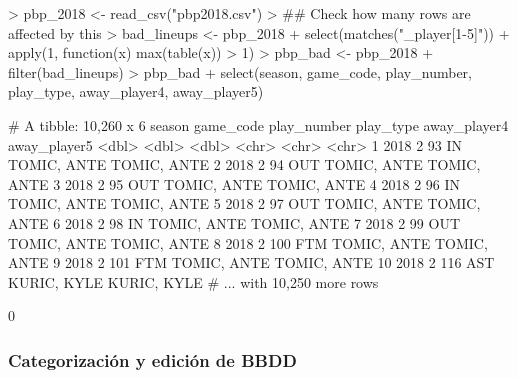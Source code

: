 \documentclass[paper=a4, fontsize=9pt]{article}
\begin{document}
\begin{Schunk}
\begin{Sinput}
> pbp_2018 <- read_csv("pbp2018.csv")
> ## Check how many rows are affected by this
> bad_lineups <- pbp_2018 %
+   select(matches("_player[1-5]")) %
+   apply(1, function(x) max(table(x)) > 1)
> pbp_bad <- pbp_2018 %
+   filter(bad_lineups)
> pbp_bad %
+   select(season, game_code, play_number, play_type, away_player4, away_player5)
\end{Sinput}
\begin{Soutput}
# A tibble: 10,260 x 6
   season game_code play_number play_type away_player4 away_player5
    <dbl>     <dbl>       <dbl> <chr>     <chr>        <chr>       
 1   2018         2          93 IN        TOMIC, ANTE  TOMIC, ANTE 
 2   2018         2          94 OUT       TOMIC, ANTE  TOMIC, ANTE 
 3   2018         2          95 OUT       TOMIC, ANTE  TOMIC, ANTE 
 4   2018         2          96 IN        TOMIC, ANTE  TOMIC, ANTE 
 5   2018         2          97 OUT       TOMIC, ANTE  TOMIC, ANTE 
 6   2018         2          98 IN        TOMIC, ANTE  TOMIC, ANTE 
 7   2018         2          99 OUT       TOMIC, ANTE  TOMIC, ANTE 
 8   2018         2         100 FTM       TOMIC, ANTE  TOMIC, ANTE 
 9   2018         2         101 FTM       TOMIC, ANTE  TOMIC, ANTE 
10   2018         2         116 AST       KURIC, KYLE  KURIC, KYLE 
# ... with 10,250 more rows
\end{Soutput}
\begin{Soutput}
[1] 0
\end{Soutput}
\end{Schunk}

\subsubsection{Categorización y edición de BBDD}
    
\end{document}
